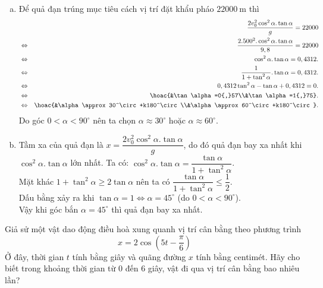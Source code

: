 \begin{bt}
\begin{bt}
{\begin{enumerate}[a)]
\begin{center}
			      \end{center}
			      Vậy tầm xa của quả đạn tính theo góc $\alpha$ là $x=\dfrac{2 v_0^2 \cos ^2 \alpha.\tan \alpha}{g}$.
			\item Để quả đạn trúng mục tiêu cách vị trí đặt khẩu pháo $22000 \mathrm{~m}$ thì
			      \begin{eqnarray*}
				      &&\dfrac{2 v_0^2 \cos ^2 \alpha.\tan \alpha}{g}=22000 \\
				      &\Leftrightarrow &	\dfrac{2. 500^2. \cos ^2 \alpha.\tan \alpha}{9,8}=22000 \\
				      &\Leftrightarrow &\cos ^2 \alpha.\tan \alpha=0,4312.\\
				      &\Leftrightarrow &\dfrac{1}{1+\tan^2\alpha}.\tan \alpha=0,4312.\\
				      &\Leftrightarrow &0,4312\tan^2 \alpha-\tan\alpha+0,4312=0.\\
				      &\Leftrightarrow &\hoac{&\tan\alpha=0{,}57\\&\tan\alpha=1{,}75}.\\
				      &\Leftrightarrow &\hoac{&\alpha\approx 30^\circ +k180^\circ \\&\alpha\approx 60^\circ +k180^\circ}.
			      \end{eqnarray*} Do góc $0<\alpha<90^\circ$ nên ta chọn $\alpha\approx 30^\circ$ hoặc $\alpha\approx 60^\circ$.
			\item Tầm xa của quả đạn là $x=\dfrac{2 v_0^2 \cos ^2 \alpha.\tan \alpha}{g}$, do đó quả đạn bay xa nhất khi $ \cos ^2 \alpha.\tan \alpha$ lớn nhất. Ta có: $\cos ^2 \alpha.\tan \alpha =\dfrac{\tan \alpha}{1+\tan^2\alpha}$.\\ Mặt khác $1+\tan^2\alpha \ge 2\tan\alpha$ nên ta có $\dfrac{\tan \alpha}{1+\tan^2\alpha} \le \dfrac{1}{2}$.\\ Dấu bằng xảy ra khi $\tan\alpha =1 \Leftrightarrow \alpha=45^\circ $ (do $0<\alpha<90^\circ$). \\
			      Vậy khi góc bắn $\alpha=45^\circ$ thì quả đạn bay xa nhất.
		\end{enumerate}}
\end{bt}
\begin{bt}%
	Giả sử một vật dao động điều hoà xung quanh vị trí cân bằng theo phương trình
	$$
		x=2 \cos \left(5 t-\dfrac{\pi}{6}\right)
	$$
	Ở đây, thời gian $t$ tính bằng giây và quãng đường $x$ tính bằng centimét. Hãy cho biết trong khoảng thời gian từ $ 0 $ đến $ 6 $ giây, vật đi qua vị trí cân bằng bao nhiêu lần?
\end{bt}

\end{bt}

